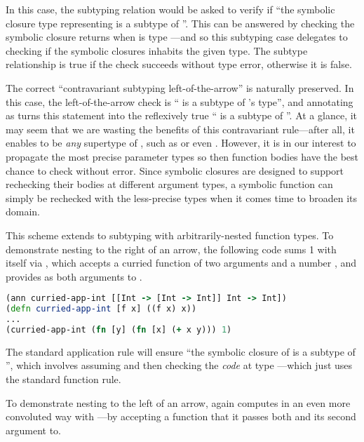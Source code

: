 In this case, the subtyping relation would be asked to verify if
``the symbolic closure type representing 
is a subtype of ''.
This can be answered by checking the symbolic closure
returns  when 
 is type ---and so this subtyping case
delegates to checking if the symbolic closures inhabits the given type.
The subtype relationship is true if the check succeeds without type error,
otherwise it is false.

The correct ``contravariant subtyping left-of-the-arrow''
is naturally preserved.
In this case, the left-of-the-arrow check is `` is a subtype of 's type'', and
annotating  as  turns this statement into the reflexively true `` is a subtype of ''.
At a glance, it may seem that we are wasting the benefits
of this contravariant rule---after all, it enables  to be \emph{any} supertype of
, such as  or even .
However, it is in our interest to propagate the most precise parameter types
so then function bodies have the best chance to check without error.
Since symbolic closures are designed to support rechecking their bodies at different argument types,
a symbolic function can simply be rechecked with the less-precise types
when it comes time to broaden its domain.

This scheme extends to subtyping with arbitrarily-nested function types.
To demonstrate nesting to the right of an arrow,
the following code sums 1 with itself via
, which accepts a curried
function of two arguments  and a number , and 
provides  as both arguments to .

\begin{lstlisting}[language=Clojure]
(ann curried-app-int [[Int -> [Int -> Int]] Int -> Int])
(defn curried-app-int [f x] ((f x) x))
...
(curried-app-int (fn [y] (fn [x] (+ x y))) 1)
\end{lstlisting}

The standard application rule will ensure 
``the symbolic closure of 
is a subtype of
'', which involves assuming
 and then checking the \emph{code} 
at type ---which just uses the standard
function rule.

To demonstrate nesting to the left of an arrow,
 again computes 
in an even more convoluted way with ---by accepting a function
 that it passes both  and its second argument to.

